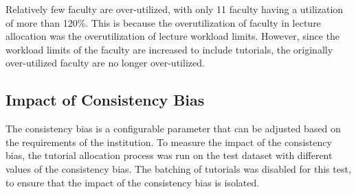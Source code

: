 Relatively few faculty are over-utilized, with only 11 faculty having a utilization of more than 120\%. This is because the overutilization of faculty in lecture allocation was the overutilization of lecture workload limits. However, since the workload limits of the faculty are increased to include tutorials, the originally over-utilized faculty are no longer over-utilized.

\subsection{Impact of Consistency Bias}

The consistency bias is a configurable parameter that can be adjusted based on the requirements of the institution. To measure the impact of the consistency bias, the tutorial allocation process was run on the test dataset with different values of the consistency bias. The batching of tutorials was disabled for this test, to ensure that the impact of the consistency bias is isolated.


